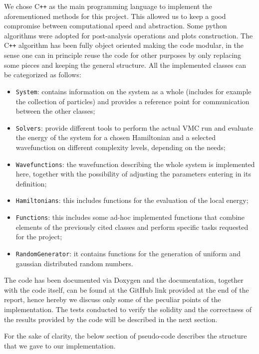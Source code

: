 We chose C\texttt{++} as the main programming language to implement the aforementioned methods for this project. This allowed us to keep a good compromise between computational speed and abstraction. Some python algorithms were adopted for post-analysis operations and plots construction. The C\texttt{++} algorithm has been fully object oriented making the code modular, in the sense one can in principle reuse the code for other purposes by only replacing some pieces and keeping the general structure. All the implemented classes can be categorized as follows:
\begin{itemize}
    \item \texttt{System}: contains information on the system as a whole (includes for example the collection of particles) and provides a reference point for communication between the other classes;
    \item \texttt{Solvers}: provide different tools to perform the actual VMC run and evaluate the energy of the system for a chosen Hamiltonian and a selected wavefunction on different complexity levels, depending on the needs;
    \item \texttt{Wavefunctions}: the wavefunction describing the whole system is implemented here, together with the possibility of adjusting the parameters entering in its definition;
    \item \texttt{Hamiltonians}: this includes functions for the evaluation of the local energy;
    \item \texttt{Functions}: this includes some ad-hoc implemented functions that combine elements of the previously cited classes and perform specific tasks requested for the project;
    \item \texttt{RandomGenerator}: it contains functions for the generation of uniform and gaussian distributed random numbers.
\end{itemize}
The code has been documented via Doxygen and the documentation, together with the code itself, can be found at the GitHub link provided at the end of the report, hence hereby we discuss only some of the peculiar points of the implementation. The tests conducted to verify the solidity and the correctness of the results provided by the code will be described in the next section.

For the sake of clarity, the below section of pseudo-code describes the structure that we gave to our implementation. 


